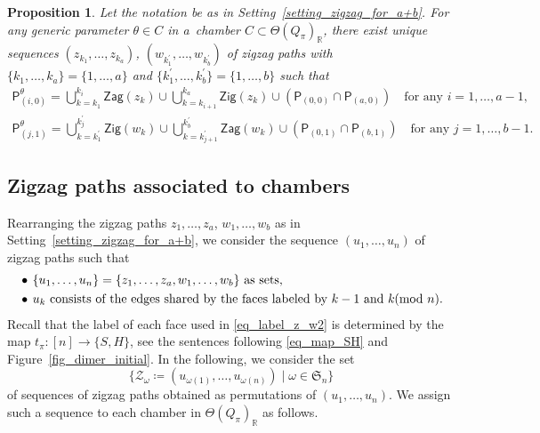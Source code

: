 \documentclass[10pt,a4paper]{amsart}
\numberwithin{equation}{section}
\newtheorem{Proposition}[Theorem]{Proposition}
\theoremstyle{definition}
\newcommand{\RR}{\mathbb{R}}
\newcommand{\calZ}{\mathcal{Z}}
\newcommand{\fkS}{\mathfrak{S}}
\newcommand{\sfP}{\mathsf{P}}
\newcommand{\Zig}{\mathsf{Zig}}
\newcommand{\Zag}{\mathsf{Zag}}
\newcommand{\perm}{\pi}
\newcommand{\permII}{\omega}
\begin{document}
\begin{Proposition}\label{prop_bPM_zzsequence}\samepage
Let the notation be as in Setting~{\rm \ref{setting_zigzag_for_a+b}}.
For any generic parameter $\theta\in C$ in a~chamber $C\subset\Theta(Q_\perm)_\RR$,
there exist unique sequences $(z_{k_1},\dots, z_{k_a})$, $(w_{k^\prime_1}, \dots, w_{k^\prime_b})$ of zigzag paths
with $\{k_1,\dots, k_a\}=\{1,\dots,a\}$ and $\{k^\prime_1,\dots, k^\prime_b\}=\{1,\dots, b\}$ such that
\begin{gather}
\label{eq_bPM_from_zz1}
\sfP^\theta_{(i,0)}=\bigcup_{k=k_1}^{k_i}\Zag(z_k)\cup\bigcup_{k=k_{i+1}}^{k_a}\Zig(z_k) \cup (\sfP_{(0,0)}\cap\sfP_{(a,0)} ) \quad \text{for any $i=1,\dots, a-1$},
\\
\label{eq_bPM_from_zz2}
\sfP^\theta_{(j,1)}=\bigcup_{k=k^\prime_1}^{k^\prime_j}\Zig(w_k)\cup\bigcup_{k=k^\prime_{j+1}}^{k^\prime_b}\Zag(w_k) \cup (\sfP_{(0,1)}\cap\sfP_{(b,1)} ) \quad \text{for any $j=1,\dots, b-1$}.
\end{gather}
\end{Proposition}

\subsection{Zigzag paths associated to chambers}
\label{subsec_zigzag_ass_chamber}

Rearranging the zigzag paths $z_1, \dots, z_a$, $w_1, \dots, w_b$ as in Setting~\ref{setting_zigzag_for_a+b},
we consider the sequence $(u_1, \dots, u_n)$ of zigzag paths such that
\begin{align}
\label{eq_label_z_w}
&\bullet\, \text{$\{u_1, \dots, u_n\}=\{z_1,\dots, z_a, w_1,\dots, w_b\}$ as sets,} \\
\label{eq_label_z_w2}
&\bullet\, \text{$u_k$ consists of the edges shared by the faces labeled by $k-1$ and $k$ \hspace{-8pt}$\pmod n$.}
\end{align}
Recall that the label of each face used in \eqref{eq_label_z_w2} is determined by the map $t_\perm\colon [n]\rightarrow \{S, H\}$,
see the sentences following \eqref{eq_map_SH} and Figure~\ref{fig_dimer_initial}.
In the following, we consider the set
\[
\{\calZ_\permII\coloneqq (u_{\permII(1)}, \dots, u_{\permII(n)}) \mid \permII\in\fkS_n\}
\]
of sequences of zigzag paths obtained as permutations of $(u_1, \dots, u_n)$.
We assign such a sequence to each chamber in $\Theta(Q_\perm)_\RR$ as follows.
\end{document}
